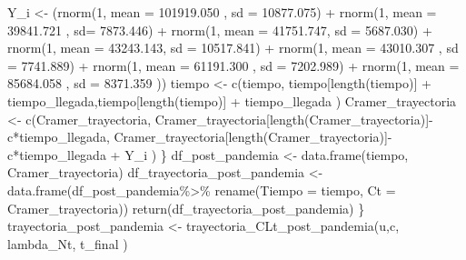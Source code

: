 \documentclass[
  us-letterpaper,
]{scrreprt}
\newenvironment{Shaded}{\begin{snugshade}}{\end{snugshade}}
\newcommand{\AttributeTok}[1]{\textcolor[rgb]{0.40,0.45,0.13}{#1}}
\newcommand{\DecValTok}[1]{\textcolor[rgb]{0.68,0.00,0.00}{#1}}
\newcommand{\FloatTok}[1]{\textcolor[rgb]{0.68,0.00,0.00}{#1}}
\newcommand{\FunctionTok}[1]{\textcolor[rgb]{0.28,0.35,0.67}{#1}}
\newcommand{\NormalTok}[1]{\textcolor[rgb]{0.00,0.23,0.31}{#1}}
\newcommand{\OtherTok}[1]{\textcolor[rgb]{0.00,0.23,0.31}{#1}}
\newcommand{\SpecialCharTok}[1]{\textcolor[rgb]{0.37,0.37,0.37}{#1}}
\theoremstyle{definition}
\theoremstyle{plain}
\theoremstyle{plain}
\theoremstyle{remark}
\begin{document}
\begin{Shaded}
\begin{Highlighting}[]
\NormalTok{    Y\_i }\OtherTok{\textless{}{-}}\NormalTok{  (}\FunctionTok{rnorm}\NormalTok{(}\DecValTok{1}\NormalTok{, }\AttributeTok{mean =} \FloatTok{101919.050}\NormalTok{ , }\AttributeTok{sd =} \FloatTok{10877.075}\NormalTok{) }\SpecialCharTok{+} 
            \FunctionTok{rnorm}\NormalTok{(}\DecValTok{1}\NormalTok{, }\AttributeTok{mean =}  \FloatTok{39841.721}\NormalTok{ , }\AttributeTok{sd=} \FloatTok{7873.446}\NormalTok{) }\SpecialCharTok{+}  
            \FunctionTok{rnorm}\NormalTok{(}\DecValTok{1}\NormalTok{, }\AttributeTok{mean =}   \FloatTok{41751.747}\NormalTok{, }\AttributeTok{sd =} \FloatTok{5687.030}\NormalTok{) }\SpecialCharTok{+} 
            \FunctionTok{rnorm}\NormalTok{(}\DecValTok{1}\NormalTok{, }\AttributeTok{mean =}   \FloatTok{43243.143}\NormalTok{, }\AttributeTok{sd =} \FloatTok{10517.841}\NormalTok{) }\SpecialCharTok{+} 
            \FunctionTok{rnorm}\NormalTok{(}\DecValTok{1}\NormalTok{, }\AttributeTok{mean =} \FloatTok{43010.307}\NormalTok{  , }\AttributeTok{sd =} \FloatTok{7741.889}\NormalTok{) }\SpecialCharTok{+} 
            \FunctionTok{rnorm}\NormalTok{(}\DecValTok{1}\NormalTok{, }\AttributeTok{mean =} \FloatTok{61191.300}\NormalTok{  , }\AttributeTok{sd =} \FloatTok{7202.989}\NormalTok{) }\SpecialCharTok{+} 
            \FunctionTok{rnorm}\NormalTok{(}\DecValTok{1}\NormalTok{, }\AttributeTok{mean =}  \FloatTok{85684.058}\NormalTok{ , }\AttributeTok{sd =} \FloatTok{8371.359}\NormalTok{ )) }
\NormalTok{    tiempo }\OtherTok{\textless{}{-}} \FunctionTok{c}\NormalTok{(tiempo, tiempo[}\FunctionTok{length}\NormalTok{(tiempo)] }\SpecialCharTok{+} 
\NormalTok{                tiempo\_llegada,tiempo[}\FunctionTok{length}\NormalTok{(tiempo)] }\SpecialCharTok{+} 
\NormalTok{                tiempo\_llegada ) }
\NormalTok{    Cramer\_trayectoria }\OtherTok{\textless{}{-}} \FunctionTok{c}\NormalTok{(Cramer\_trayectoria,}
\NormalTok{                    Cramer\_trayectoria[}\FunctionTok{length}\NormalTok{(Cramer\_trayectoria)]}\SpecialCharTok{{-}}
\NormalTok{                          c}\SpecialCharTok{*}\NormalTok{tiempo\_llegada, }
\NormalTok{                    Cramer\_trayectoria[}\FunctionTok{length}\NormalTok{(Cramer\_trayectoria)]}\SpecialCharTok{{-}} 
\NormalTok{                            c}\SpecialCharTok{*}\NormalTok{tiempo\_llegada }\SpecialCharTok{+}\NormalTok{ Y\_i )}
\NormalTok{  \}}
\NormalTok{  df\_post\_pandemia }\OtherTok{\textless{}{-}} \FunctionTok{data.frame}\NormalTok{(tiempo, Cramer\_trayectoria)}
\NormalTok{  df\_trayectoria\_post\_pandemia }\OtherTok{\textless{}{-}} \FunctionTok{data.frame}\NormalTok{(df\_post\_pandemia}\SpecialCharTok{\%\textgreater{}\%} 
                                          \FunctionTok{rename}\NormalTok{(}\AttributeTok{Tiempo =}\NormalTok{ tiempo, }
                                          \AttributeTok{Ct =}\NormalTok{ Cramer\_trayectoria))}
  \FunctionTok{return}\NormalTok{(df\_trayectoria\_post\_pandemia)}
\NormalTok{\}}
\NormalTok{trayectoria\_post\_pandemia }\OtherTok{\textless{}{-}} \FunctionTok{trayectoria\_CLt\_post\_pandemia}\NormalTok{(u,c,}
\NormalTok{                                            lambda\_Nt, t\_final )}



\end{Highlighting}
\end{Shaded}
\end{document}
